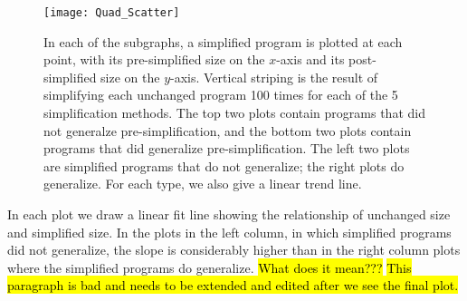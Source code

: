 \begin{figure}[t] %
\centering
\texttt{[image: Quad\_Scatter]} %
\caption{In each of the subgraphs, a simplified program is plotted at each point, with its pre-simplified size on the $x$-axis and its post-simplified size on the $y$-axis. Vertical striping is the result of simplifying each unchanged program 100 times for each of the 5 simplification methods. The top two plots contain programs that did not generalze pre-simplification, and the bottom two plots contain programs that did generalize pre-simplification. The left two plots are simplified programs that do not generalize; the right plots do generalize. For each type, we also give a linear trend line.}
\label{fig:nic-plot}
\end{figure}

In each plot we draw a linear fit line showing the relationship of unchanged size and simplified size. In the plots in the left column, in which simplified programs did not generalize, the slope is considerably higher than in the right column plots where the simplified programs do generalize. \hl{What does it mean???} \hl{This paragraph is bad and needs to be extended and edited after we see the final plot.}



%
%


